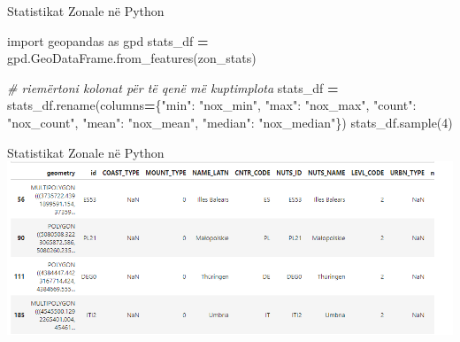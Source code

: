 \documentclass[
  ignorenonframetext,
]{beamer}
\newenvironment{Shaded}{\begin{snugshade}}{\end{snugshade}}
\newcommand{\CommentTok}[1]{\textcolor[rgb]{0.56,0.35,0.01}{\textit{#1}}}
\newcommand{\DecValTok}[1]{\textcolor[rgb]{0.00,0.00,0.81}{#1}}
\newcommand{\ImportTok}[1]{#1}
\newcommand{\NormalTok}[1]{#1}
\newcommand{\OperatorTok}[1]{\textcolor[rgb]{0.81,0.36,0.00}{\textbf{#1}}}
\newcommand{\StringTok}[1]{\textcolor[rgb]{0.31,0.60,0.02}{#1}}
\begin{document}
\begin{frame}[fragile]{Statistikat Zonale në Python}
\protect\hypertarget{statistikat-zonale-nuxeb-python-4}{}

\begin{Shaded}
\begin{Highlighting}[]
\ImportTok{import}\NormalTok{ geopandas }\ImportTok{as}\NormalTok{ gpd}
\NormalTok{stats\_df }\OperatorTok{=}\NormalTok{ gpd.GeoDataFrame.from\_features(zon\_stats)}

\CommentTok{\# riemërtoni kolonat për të qenë më kuptimplota}
\NormalTok{stats\_df }\OperatorTok{=}\NormalTok{ stats\_df.rename(columns}\OperatorTok{=}\NormalTok{\{}\StringTok{"min"}\NormalTok{: }\StringTok{"nox\_min"}\NormalTok{,}
                                    \StringTok{"max"}\NormalTok{: }\StringTok{"nox\_max"}\NormalTok{,}
                                    \StringTok{"count"}\NormalTok{: }\StringTok{"nox\_count"}\NormalTok{,}
                                    \StringTok{"mean"}\NormalTok{: }\StringTok{"nox\_mean"}\NormalTok{,}
                                    \StringTok{"median"}\NormalTok{: }\StringTok{"nox\_median"}\NormalTok{\})}
\NormalTok{stats\_df.sample(}\DecValTok{4}\NormalTok{)}
\end{Highlighting}
\end{Shaded}
\end{frame}

\begin{frame}{Statistikat Zonale në Python}
\protect\hypertarget{statistikat-zonale-nuxeb-python-5}{}
\includegraphics{./Figs/regstat.png}
\end{frame}
\end{document}
